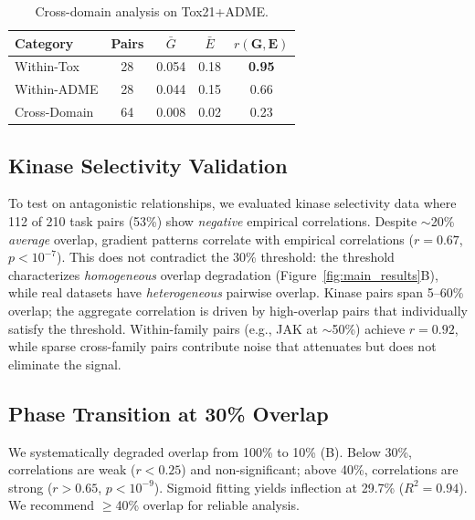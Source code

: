 \documentclass{article}
\newcommand{\G}{\mathbf{G}}
\newcommand{\E}{\mathbf{E}}
\begin{document}
\begin{table}[H]
\caption{Cross-domain analysis on Tox21+ADME.}
\label{tab:cross_domain}
\vskip 0.1in
\begin{center}
\begin{small}
\begin{tabular*}{\columnwidth}{@{\extracolsep{\fill}}lcccc@{}}
\toprule
Category & Pairs & $\bar{G}$ & $\bar{E}$ & $r(\G, \E)$ \\
\midrule
Within-Tox & 28 & 0.054 & 0.18 & \textbf{0.95} \\
Within-ADME & 28 & 0.044 & 0.15 & 0.66 \\
Cross-Domain & 64 & 0.008 & 0.02 & 0.23 \\
\bottomrule
\end{tabular*}
\end{small}
\end{center}
\end{table}

\subsection{Kinase Selectivity Validation}

To test on antagonistic relationships, we evaluated kinase selectivity data \citep{davis2011kinase} where 112 of 210 task pairs (53\%) show \textit{negative} empirical correlations. Despite $\sim$20\% \textit{average} overlap, gradient patterns correlate with empirical correlations ($r = 0.67$, $p < 10^{-7}$). This does not contradict the 30\% threshold: the threshold characterizes \textit{homogeneous} overlap degradation (Figure~\ref{fig:main_results}B), while real datasets have \textit{heterogeneous} pairwise overlap. Kinase pairs span 5--60\% overlap; the aggregate correlation is driven by high-overlap pairs that individually satisfy the threshold. Within-family pairs (e.g., JAK at $\sim$50\%) achieve $r = 0.92$, while sparse cross-family pairs contribute noise that attenuates but does not eliminate the signal.

\subsection{Phase Transition at 30\% Overlap}

We systematically degraded overlap from 100\% to 10\% (B). Below 30\%, correlations are weak ($r < 0.25$) and non-significant; above 40\%, correlations are strong ($r > 0.65$, $p < 10^{-9}$). Sigmoid fitting yields inflection at 29.7\% ($R^2 = 0.94$). We recommend $\geq$40\% overlap for reliable analysis.
\end{document}
